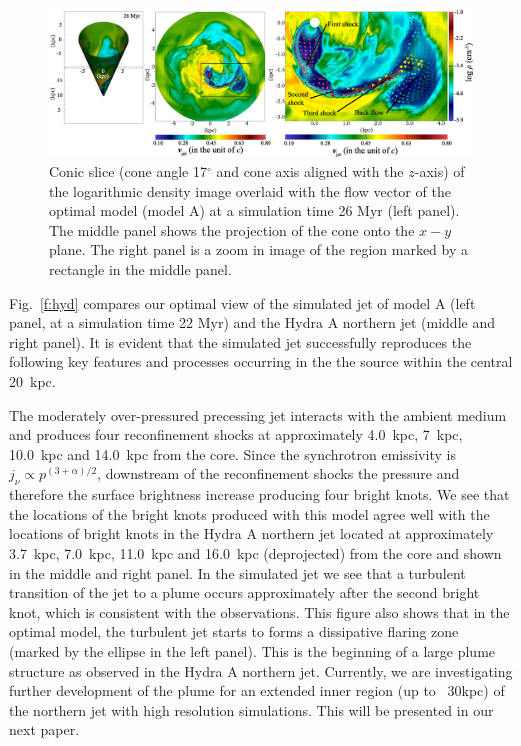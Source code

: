 \documentclass[useAMS, usenatbib]{mn2e}
\begin{document}
\begin{figure}
\centering
\includegraphics[width=\textwidth]{fig6.eps}
\caption{ Conic slice (cone angle 17$^{\circ}$ and cone axis aligned with the $z$-axis) of the logarithmic density image overlaid with the flow vector of the optimal model (model A) at a simulation time 26 Myr (left panel). The middle panel shows the projection of the cone onto the $x-y$ plane. The right panel is a zoom in image of the region marked by a rectangle in the middle panel.  }
\label{f:fdir}
\end{figure}

Fig.~\ref{f:hyd} compares our optimal view of the simulated jet of model A (left panel, at a simulation time 22 Myr) and the Hydra A northern jet (middle and right panel). It is evident that the simulated jet successfully reproduces the following key features and processes occurring in the the source within the central 20~kpc. 

The moderately over-pressured precessing jet interacts with the ambient medium and produces four reconfinement shocks at approximately 4.0~kpc, 7~kpc, 10.0~kpc and 14.0~kpc from the core. Since the synchrotron emissivity is $j_{\nu} \propto p^{(3+\alpha)/2}$, downstream of the reconfinement shocks the pressure and therefore the surface brightness increase producing four bright knots. We see that the locations of the bright knots produced with this model agree well with the locations of bright knots in the Hydra A northern jet located at approximately 3.7~kpc, 7.0~kpc, 11.0~kpc and 16.0~kpc (deprojected) from the core and shown in the middle and right panel. In the simulated jet we see that a turbulent transition of the jet to a plume occurs approximately after the second bright knot, which is consistent with the observations. This figure also shows that in the optimal model, the turbulent jet starts to forms a dissipative flaring zone (marked by the ellipse in the left panel). This is the beginning of a large plume structure as observed in the Hydra A northern jet. Currently, we are investigating further development of the plume for an extended inner region (up to ~30kpc) of the northern jet with high resolution simulations. This will be presented in our next paper.
\end{document}
